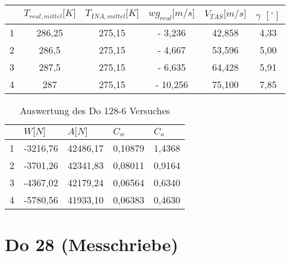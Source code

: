 \begin{table}[h]
	\centering
	\begin{tabular}{|c|c|c|c|c|c|}
		\hline
		& \multicolumn{1}{l|}{\textbf{$T_{real,mittel} {[}K{]}$}} & \multicolumn{1}{l|}{\textbf{$T_{INA,mittel} {[}K{]}$}} & \textbf{$wg_{real} {[}m/s{]}$} & \textbf{$V_{TAS} {[}m/s{]}$} & $\gamma$ $[^\circ]$ \\ \hline
		1 & 286,25                                        & 275,15                                       & - 3,236                     & 42,858                  & 4,33                   \\ \hline
		2 & 286,5                                         & 275,15                                       & - 4,667                    & 53,596                  & 5,00                   \\ \hline
		3 & 287,5                                         & 275,15                                       & - 6,635                    & 64,428                  & 5,91                   \\ \hline
		4 & 287                                           & 275,15                                       & - 10,256                   & 75,100                  & 7,85                   \\ \hline
	\end{tabular}
\end{table}

\begin{table}[h]
	\centering
	\begin{tabular}{|l|l|l|l|l|}
		\hline
		& \textbf{$W {[}N{]}$} & \textbf{$A {[}N{]}$} & \textbf{$C_w$} & \textbf{$C_a$} \\ \hline
		1 & -3216,76           & 42486,17           & 0,10879     & 1,4368      \\ \hline
		2 & -3701,26           & 42341,83           & 0,08011     & 0,9164      \\ \hline
		3 & -4367,02           & 42179,24           & 0,06564     & 0,6340      \\ \hline
		4 & -5780,56           & 41933,10           & 0,06383     & 0,4630      \\ \hline
	\end{tabular}
	\caption{Auswertung des Do 128-6 Versuches}
\end{table}








\vspace{1cm}
\section{Do 28 (Messchriebe)}

\newpage